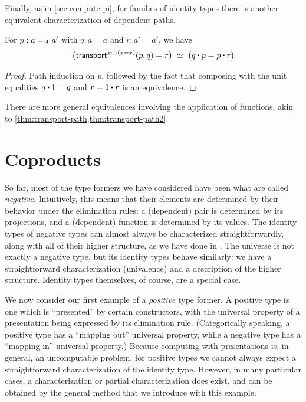 Finally, as in \autoref{sec:compute-pi}, for families of identity types there is another equivalent characterization of dependent paths.

\begin{thm}\label{thm:dpath-path}
  For $p:\id[A]a{a'}$ with $q:a=a$ and $r:a'=a'$, we have
  \[ \eqvspaced{ \big(\transfib{x\mapsto (x=x)}{p}{q} = r \big) }{ \big( q \ct p = p \ct r \big) } \]
\end{thm}
\begin{proof}
  Path induction on $p$, followed by the fact that composing with the unit equalities $q\ct 1 = q$ and $r = 1\ct r$ is an equivalence.
\end{proof}

There are more general equivalences involving the application of functions, akin to \autoref{thm:transport-path,thm:transport-path2}.


\section{Coproducts}
\label{sec:compute-coprod}

So far, most of the type formers we have considered have been what are called \emph{negative}.
Intuitively, this means that their elements are determined by their behavior under the elimination rules: a (dependent) pair is determined by its projections, and a (dependent) function is determined by its values.
The identity types of negative types can almost always be characterized straightforwardly, along with all of their higher structure, as we have done in .
The universe is not exactly a negative type, but its identity types behave similarly: we have a straightforward characterization (univalence) and a description of the higher structure.
Identity types themselves, of course, are a special case.

We now consider our first example of a \emph{positive} type former.
A positive type is one which is ``presented'' by certain constructors, with the universal property of a presentation being expressed by its elimination rule.
(Categorically speaking, a positive type has a ``mapping out'' universal property, while a negative type has a ``mapping in'' universal property.)
Because computing with presentations is, in general, an uncomputable problem, for positive types we cannot always expect a straightforward characterization of the identity type.
However, in many particular cases, a characterization or partial characterization does exist, and can be obtained by the general method that we introduce with this example.

